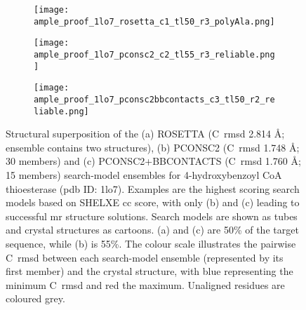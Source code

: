 \begin{figure}[H]
    \centering
    \begin{subfigure}[b]{0.32\textwidth}
        \centering
        \texttt{[image: ample\_proof\_1lo7\_rosetta\_c1\_tl50\_r3\_polyAla.png]}
        \caption{}
        \label{fig:ample_proof_1lo7_rosetta}
    \end{subfigure}
    \begin{subfigure}[b]{0.32\textwidth}
        \centering
        \texttt{[image: ample\_proof\_1lo7\_pconsc2\_c2\_tl55\_r3\_reliable.png]}
        \caption{}
        \label{fig:ample_proof_1lo7_pconsc2}
    \end{subfigure}
    \begin{subfigure}[b]{0.32\textwidth}
        \centering
        \texttt{[image: ample\_proof\_1lo7\_pconsc2bbcontacts\_c3\_tl50\_r2\_reliable.png]}
        \caption{}
        \label{fig:ample_proof_1lo7_pconsc2bbcontacts}
    \end{subfigure}

    \caption[Structural superposition of three search models for target 1lo7]{Structural superposition of the (a) ROSETTA (C\textalpha\ \gls{rmsd} 2.814 \AA; ensemble contains two structures), (b) PCONSC2 (C\textalpha\ \gls{rmsd} 1.748 \AA; 30 members) and (c) PCONSC2+BBCONTACTS (C\textalpha\ \gls{rmsd} 1.760 \AA; 15 members) search-model ensembles for 4-hydroxybenzoyl CoA thioesterase (\gls{pdb} ID: 1lo7). Examples are the highest scoring search models based on SHELXE \gls{cc} score, with only (b) and (c) leading to successful \gls{mr} structure solutions. Search models are shown as tubes and crystal structures as cartoons. (a) and (c) are 50\% of the target sequence, while (b) is 55\%. The colour scale illustrates the pairwise C\textalpha\ \gls{rmsd} between each search-model ensemble (represented by its first member) and the crystal structure, with blue representing the minimum C\textalpha\ \gls{rmsd} and red the maximum. Unaligned residues are coloured grey.}
    \label{fig:ample_proof_example_1lo7}
\end{figure}

